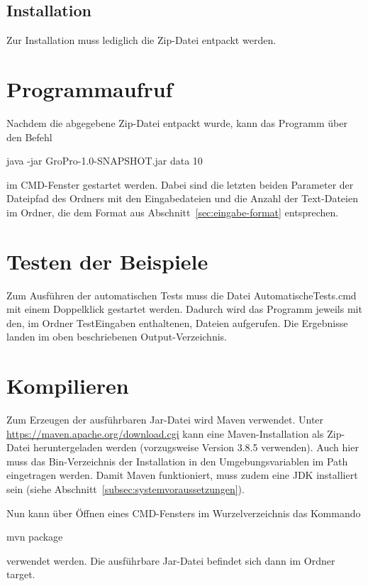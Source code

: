 \subsection{Installation}\label{subsec:installation}
Zur Installation muss lediglich die Zip-Datei entpackt werden.

\section{Programmaufruf}\label{sec:programmaufruf}
Nachdem die abgegebene Zip-Datei entpackt wurde, kann das Programm über den Befehl
\begin{center}
    \colorbox{gray!20}{
        \begin{minipage}{0.9\textwidth}
            java -jar GroPro-1.0-SNAPSHOT.jar data 10
        \end{minipage}
    }
\end{center}
im CMD-Fenster gestartet werden.
Dabei sind die letzten beiden Parameter der Dateipfad des Ordners mit den Eingabedateien und die Anzahl der Text-Dateien im Ordner, die dem Format aus Abschnitt~\ref{sec:eingabe-format} entsprechen.

\section{Testen der Beispiele}\label{sec:testen-der-beispiele}
Zum Ausführen der automatischen Tests muss die Datei \glqq AutomatischeTests.cmd \grqq{} mit einem Doppelklick gestartet werden.
Dadurch wird das Programm jeweils mit den, im Ordner \glqq TestEingaben \grqq{} enthaltenen, Dateien aufgerufen.
Die Ergebnisse landen im oben beschriebenen Output-Verzeichnis.

\section{Kompilieren}\label{sec:kompilieren}

Zum Erzeugen der ausführbaren Jar-Datei wird Maven verwendet.
Unter \url{https://maven.apache.org/download.cgi} kann eine Maven-Installation als Zip-Datei heruntergeladen werden (vorzugsweise Version 3.8.5 verwenden).
Auch hier muss das Bin-Verzeichnis der Installation in den Umgebungsvariablen im Path eingetragen werden.
Damit Maven funktioniert, muss zudem eine JDK installiert sein (siehe Abschnitt~\ref{subsec:systemvoraussetzungen}).

Nun kann über Öffnen eines CMD-Fensters im Wurzelverzeichnis das Kommando
\begin{center}
    \colorbox{gray!20}{
        \begin{minipage}{0.9\textwidth}
            mvn package
        \end{minipage}
    }
\end{center}
verwendet werden.
Die ausführbare Jar-Datei befindet sich dann im Ordner \glqq target\grqq{}.